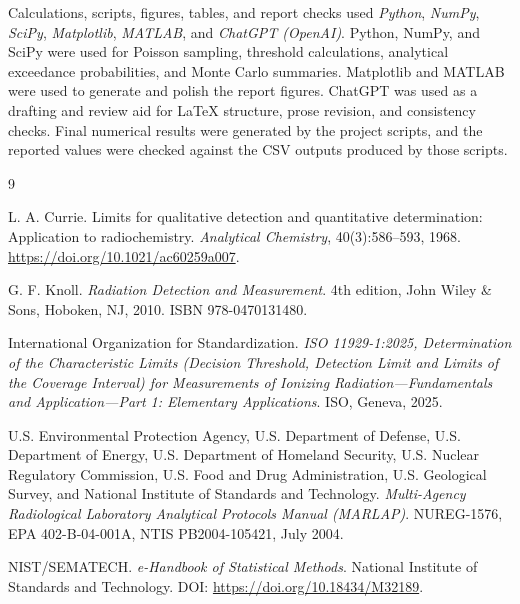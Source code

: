 \documentclass[11pt,twocolumn]{article}
\begin{document}
Calculations, scripts, figures, tables, and report checks used \textit{Python}, \textit{NumPy}, \textit{SciPy}, \textit{Matplotlib}, \textit{MATLAB}, and \textit{ChatGPT (OpenAI)}. Python, NumPy, and SciPy were used for Poisson sampling, threshold calculations, analytical exceedance probabilities, and Monte Carlo summaries. Matplotlib and MATLAB were used to generate and polish the report figures. ChatGPT was used as a drafting and review aid for LaTeX structure, prose revision, and consistency checks. Final numerical results were generated by the project scripts, and the reported values were checked against the CSV outputs produced by those scripts.

\FloatBarrier

\begin{thebibliography}{9}

L. A. Currie.
Limits for qualitative detection and quantitative determination: Application to radiochemistry.
\emph{Analytical Chemistry}, 40(3):586--593, 1968.
\url{https://doi.org/10.1021/ac60259a007}.

G. F. Knoll.
\emph{Radiation Detection and Measurement}.
4th edition, John Wiley \& Sons, Hoboken, NJ, 2010.
ISBN 978-0470131480.

International Organization for Standardization.
\emph{ISO 11929-1:2025, Determination of the Characteristic Limits
(Decision Threshold, Detection Limit and Limits of the Coverage Interval)
for Measurements of Ionizing Radiation---Fundamentals and Application---Part 1:
Elementary Applications}.
ISO, Geneva, 2025.

U.S. Environmental Protection Agency, U.S. Department of Defense, U.S. Department of Energy,
U.S. Department of Homeland Security, U.S. Nuclear Regulatory Commission,
U.S. Food and Drug Administration, U.S. Geological Survey, and National Institute of Standards and Technology.
\emph{Multi-Agency Radiological Laboratory Analytical Protocols Manual (MARLAP)}.
NUREG-1576, EPA 402-B-04-001A, NTIS PB2004-105421, July 2004.

NIST/SEMATECH.
\emph{e-Handbook of Statistical Methods}.
National Institute of Standards and Technology.
DOI: \url{https://doi.org/10.18434/M32189}.

\end{thebibliography}
\end{document}
